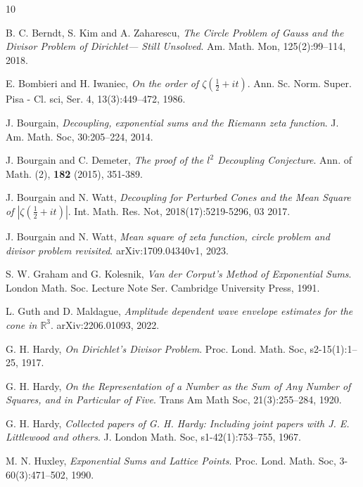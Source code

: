 \documentclass[11pt]{amsart}
\numberwithin{equation}{section}
\theoremstyle{definition}
\theoremstyle{proposition}
\begin{document}
\quad





%

\begin{thebibliography}{10}

 B. C. Berndt, S. Kim and A. Zaharescu, {\it The Circle Problem of Gauss and the Divisor Problem of Dirichlet—  Still Unsolved}. Am. Math. Mon, 125(2):99–114, 2018. 

 E. Bombieri and H. Iwaniec, {\it On the order of $\zeta (\frac{1}{2} + it)$}. Ann. Sc. Norm. Super. Pisa - Cl. sci, Ser. 4, 13(3):449–472, 1986.

 J. Bourgain, {\it Decoupling, exponential sums and the Riemann zeta function}. J. Am. Math. Soc, 30:205–224, 2014.

 J. Bourgain and C. Demeter, {\it The proof of the $l^2$ Decoupling Conjecture}. Ann. of Math. (2), \textbf{182} (2015), 351-389.

 J. Bourgain and N. Watt, {\it Decoupling for Perturbed Cones and the Mean Square of $|\zeta (\frac{1}{2}+it)|$}. Int. Math. Res. Not, 2018(17):5219-5296, 03 2017.

 J. Bourgain and N. Watt, {\it Mean square of zeta function, circle problem and divisor problem revisited}. arXiv:1709.04340v1, 2023. 

 S. W. Graham and G. Kolesnik, {\it Van der Corput's Method of Exponential Sums}. London Math. Soc. Lecture Note Ser. Cambridge University Press, 1991.

  L. Guth and D. Maldague, {\it Amplitude dependent wave envelope estimates for the cone in $\mathbb{R}^3$}. arXiv:2206.01093, 2022.

 G. H. Hardy, {\it On Dirichlet's Divisor Problem}. Proc. Lond. Math. Soc, s2-15(1):1–25, 1917.

 G. H. Hardy, {\it On the Representation of a Number as the Sum of Any Number of Squares, and in Particular of Five}. Trans Am Math Soc, 21(3):255–284, 1920. 

 G. H. Hardy, {\it Collected papers of G. H. Hardy: Including joint papers with J. E. Littlewood and others}. J. London Math. Soc, s1-42(1):753–755, 1967.

 M. N. Huxley, {\it Exponential Sums and Lattice Points}. Proc. Lond. Math. Soc, 3-60(3):471–502, 1990.


\end{thebibliography}
\end{document}
